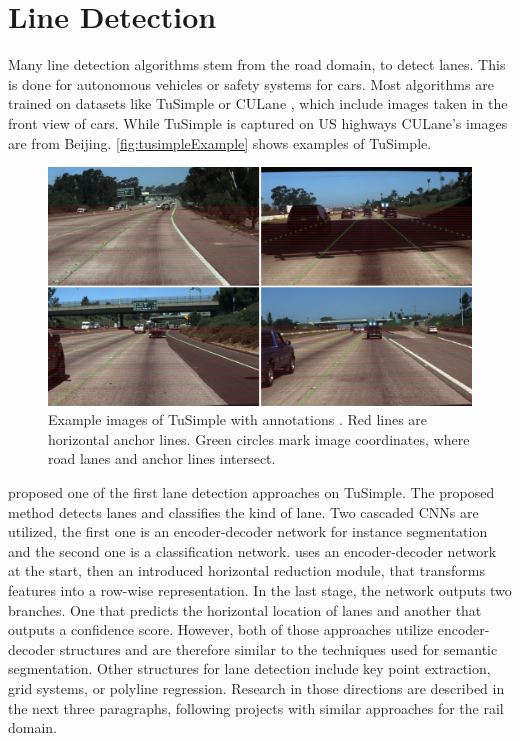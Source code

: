 \section{Line Detection}
\label{sec:lineDetection}

Many line detection algorithms stem from the road domain, to detect lanes.
This is done for autonomous vehicles or safety systems for cars.
Most algorithms are trained on datasets like TuSimple \cite{tuSimpleDataset} or CULane \cite{cuLaneDataset}, which include images taken in the front view of cars.
While TuSimple is captured on US highways CULane's images are from Beijing.
\autoref{fig:tusimpleExample} shows examples of TuSimple.

\vspace{0.8cm}

\begin{figure}[H]
    \centering
    \includegraphics[width=\linewidth]{PICs/lineDetection/tusimple_example.jpg}
    \caption{Example images of TuSimple with annotations \cite{tuSimpleDatasetExampleImage}. Red lines are horizontal anchor lines. Green circles mark image coordinates, where road lanes and anchor lines intersect.}
    \label{fig:tusimpleExample}
\end{figure}

\vspace{0.8cm}

\noindent \cite{LaneDetectionCascadedCNNs2019} proposed one of the first lane detection approaches on TuSimple.
The proposed method detects lanes and classifies the kind of lane.
Two cascaded CNNs are utilized, the first one is an encoder-decoder network for instance segmentation and the second one is a classification network.
\cite{rowwiseClassification2020} uses an encoder-decoder network at the start, then an introduced horizontal reduction module, that transforms features into a row-wise representation. In the last stage, the network outputs two branches. One that predicts the horizontal location of lanes and another that outputs a confidence score.
However, both of those approaches utilize encoder-decoder structures and are therefore similar to the techniques used for semantic segmentation.
Other structures for lane detection include key point extraction, grid systems, or polyline regression.
Research in those directions are described in the next three paragraphs, following projects with similar approaches for the rail domain.

